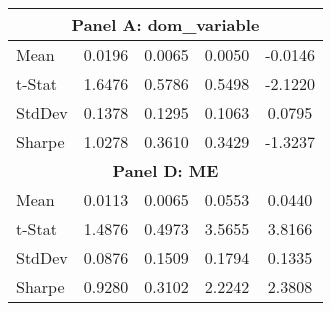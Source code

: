 \begin{table}[ht]
\begin{tabular}{lcccc}
\multicolumn{5}{c}{\textbf{Panel A: {dom_variable}}} \\
\midrule
Mean & 0.0196 & 0.0065 & 0.0050 & -0.0146 \\
t-Stat & 1.6476 & 0.5786 & 0.5498 & -2.1220 \\
StdDev & 0.1378 & 0.1295 & 0.1063 & 0.0795 \\
Sharpe & 1.0278 & 0.3610 & 0.3429 & -1.3237 \\
\midrule

\multicolumn{5}{c}{\textbf{Panel D: ME}} \\
\midrule
Mean & 0.0113 & 0.0065 & 0.0553 & 0.0440 \\
t-Stat & 1.4876 & 0.4973 & 3.5655 & 3.8166 \\
StdDev & 0.0876 & 0.1509 & 0.1794 & 0.1335 \\
Sharpe & 0.9280 & 0.3102 & 2.2242 & 2.3808 \\
\bottomrule
\end{tabular}
\end{table}
